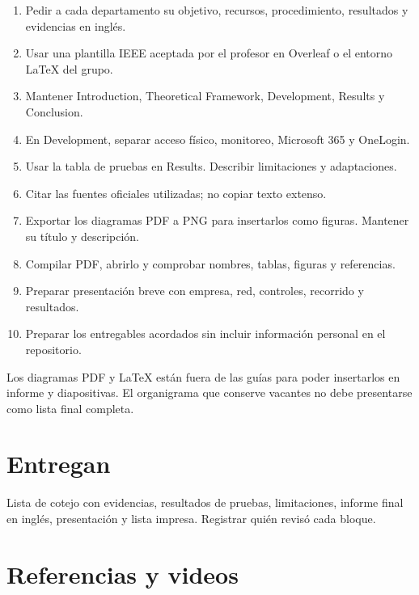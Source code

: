 \documentclass[12pt,a4paper]{article}
\begin{document}
\begin{enumerate}
\item Pedir a cada departamento su objetivo, recursos, procedimiento, resultados y evidencias en inglés.
\item Usar una plantilla IEEE aceptada por el profesor en Overleaf o el entorno LaTeX del grupo.
\item Mantener Introduction, Theoretical Framework, Development, Results y Conclusion.
\item En Development, separar acceso físico, monitoreo, Microsoft 365 y OneLogin.
\item Usar la tabla de pruebas en Results. Describir limitaciones y adaptaciones.
\item Citar las fuentes oficiales utilizadas; no copiar texto extenso.
\item Exportar los diagramas PDF a PNG para insertarlos como figuras. Mantener su título y descripción.
\item Compilar PDF, abrirlo y comprobar nombres, tablas, figuras y referencias.
\item Preparar presentación breve con empresa, red, controles, recorrido y resultados.
\item Preparar los entregables acordados sin incluir información personal en el repositorio.
\end{enumerate}
Los diagramas PDF y LaTeX están fuera de las guías para poder insertarlos en informe y diapositivas. El organigrama que conserve vacantes no debe presentarse como lista final completa.\par
{}\section*{Entregan}
Lista de cotejo con evidencias, resultados de pruebas, limitaciones, informe final en inglés, presentación y lista impresa. Registrar quién revisó cada bloque.\par
{}\section*{Referencias y videos}
\end{document}
